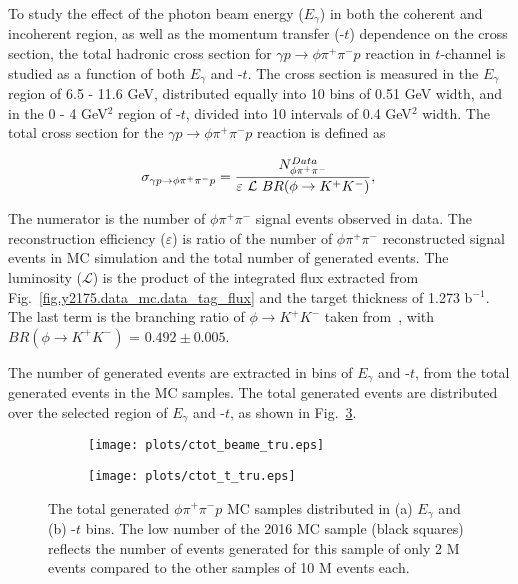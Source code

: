 To study the effect of the photon beam energy ($E_{\gamma}$) in both the coherent and incoherent region, as well as the momentum transfer (-$t$) dependence on the cross section, the total hadronic cross section for $\gamma p \rightarrow \phi \pi^{+} \pi^{-} p$ reaction in $t$-channel is studied as a function of both $E_{\gamma}$ and -$t$. The cross section is measured in the $E_{\gamma}$ region of 6.5 - 11.6 GeV, distributed equally into 10 bins of 0.51 GeV width, and in the 0 - 4 GeV$^2$ region of -$t$, divided into 10 intervals of 0.4 GeV$^2$ width. The total cross section for the $\gamma p \rightarrow \phi \pi^{+} \pi^{-} p$ reaction is defined as

\begin{equation}
    \label{eq.y2175.xsec_ul.phi2pi}
    \sigma_{\gamma p \rightarrow \phi \pi^{+} \pi^{-} p} = \frac{N_{\phi\pi^+\pi^-}^{Data}}{\varepsilon~\mathcal{L}~BR(\phi\rightarrow K^{+}K^{-})},\\
\end{equation}

\noindent The numerator is the number of $\phi\pi^+\pi^-$ signal events observed in data. The reconstruction efficiency ($\varepsilon$) is ratio of the number of $\phi\pi^+\pi^-$ reconstructed signal events in MC simulation and the total number of generated events. The luminosity ($\mathcal{L}$) is the product of the integrated flux extracted from Fig.~\ref{fig.y2175.data_mc.data_tag_flux} and the target thickness of 1.273 b$^{-1}$. The last term is the branching ratio of $\phi\rightarrow K^{+}K^{-}$ taken from~\cite{Tanabashi18}, with $BR(\phi\rightarrow K^{+}K^{-})$ = $0.492 \pm 0.005$.
\par The number of generated events are extracted in bins of $E_{\gamma}$ and -$t$, from the total generated events in the MC samples. The total generated events are distributed over the selected region of $E_{\gamma}$ and -$t$, as shown in Fig.~\ref{fig.y2175.xsec_ul.phi2pi.1}.

\begin{figure}[H]
    \centering
    \begin{subfigure}[b]{0.5\textwidth}
        \texttt{[image: plots/ctot\_beame\_tru.eps]}
        \caption{}
        \label{fig.y2175.xsec_ul.phi2pi.1.a}
    \end{subfigure}\hfill
    \begin{subfigure}[b]{0.5\textwidth}
        \texttt{[image: plots/ctot\_t\_tru.eps]}
        \caption{}
        \label{fig.y2175.xsec_ul.phi2pi.1.b}
    \end{subfigure}
    \caption{\label{fig.y2175.xsec_ul.phi2pi.1}The total generated $\phi \pi^{+} \pi^{-} p$ MC samples distributed in (a) $E_{\gamma}$ and (b) -$t$ bins. The low number of the 2016 MC sample (black squares) reflects the number of events generated for this sample of only 2 M events compared to the other samples of 10 M events each.}
\end{figure}

